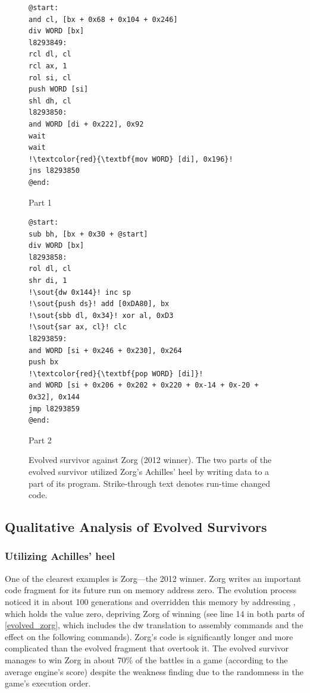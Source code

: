 \documentclass[dvipsnames, format=sigconf]{acmart}
\begin{document}
\begin{figure}
\captionsetup{type=lstlisting}
\centering
\begin{sublstlisting}{0.45\textwidth}
\begin{lstlisting}
@start:
and cl, [bx + 0x68 + 0x104 + 0x246]
div WORD [bx]
l8293849:
rcl dl, cl
rcl ax, 1
rol si, cl
push WORD [si]
shl dh, cl
l8293850:
and WORD [di + 0x222], 0x92
wait
wait
!\textcolor{red}{\textbf{mov WORD} [di], 0x196}!
jns l8293850
@end:
\end{lstlisting}
\caption{Part 1}
\end{sublstlisting}
\hfill
\begin{sublstlisting}{0.45\textwidth}
\begin{lstlisting}
@start:
sub bh, [bx + 0x30 + @start]
div WORD [bx]
l8293858:
rol dl, cl
shr di, 1
!\sout{dw 0x144}! inc sp
!\sout{push ds}! add [0xDA80], bx
!\sout{sbb dl, 0x34}! xor al, 0xD3
!\sout{sar ax, cl}! clc
l8293859:
and WORD [si + 0x246 + 0x230], 0x264
push bx
!\textcolor{red}{\textbf{pop WORD} [di]}!
and WORD [si + 0x206 + 0x202 + 0x220 + 0x-14 + 0x-20 + 0x32], 0x144
jmp l8293859
@end:
\end{lstlisting}
\caption{Part 2}
\end{sublstlisting}
\caption{Evolved survivor against Zorg (2012 winner). The two parts of the evolved survivor utilized Zorg's Achilles' heel by writing data to a part of its program. Strike-through text denotes run-time changed code.}
\label{evolved_zorg}
\end{figure}

\subsection{Qualitative Analysis of Evolved Survivors}
\subsubsection{Utilizing Achilles' heel}
One of the clearest examples is Zorg---the 2012 winner. Zorg writes an important code fragment for its future run on memory address zero. The evolution process noticed it in about 100 generations and overridden this memory by addressing , which holds the value zero, depriving Zorg of winning (see line 14 in both parts of \autoref{evolved_zorg}, which includes the dw translation to assembly commands and the effect on the following commands). Zorg's code is significantly longer and more complicated than the evolved fragment that overtook it. The evolved survivor manages to win Zorg in about 70\% of the battles in a game (according to the average engine's score) despite the weakness finding due to the randomness in the game's execution order.
\end{document}
